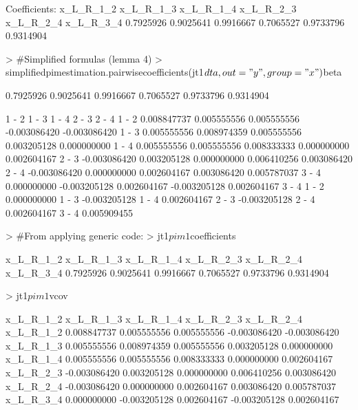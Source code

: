 \documentclass[12pt]{article}
\begin{document}
\begin{Schunk}
\begin{Soutput}
Coefficients:
x_L_R_1_2 x_L_R_1_3 x_L_R_1_4 x_L_R_2_3 x_L_R_2_4 x_L_R_3_4 
0.7925926 0.9025641 0.9916667 0.7065527 0.9733796 0.9314904 
\end{Soutput}
\begin{Sinput}
> 	#Simplified formulas (lemma 4)
> 	simplifiedpimestimation.pairwisecoefficients(jt1$dta, out="y", group="x")$beta
\end{Sinput}
\begin{Soutput}
[1] 0.7925926 0.9025641 0.9916667 0.7065527 0.9733796 0.9314904
\end{Soutput}
\begin{Soutput}
             1 - 2        1 - 3       1 - 4        2 - 3        2 - 4
1 - 2  0.008847737  0.005555556 0.005555556 -0.003086420 -0.003086420
1 - 3  0.005555556  0.008974359 0.005555556  0.003205128  0.000000000
1 - 4  0.005555556  0.005555556 0.008333333  0.000000000  0.002604167
2 - 3 -0.003086420  0.003205128 0.000000000  0.006410256  0.003086420
2 - 4 -0.003086420  0.000000000 0.002604167  0.003086420  0.005787037
3 - 4  0.000000000 -0.003205128 0.002604167 -0.003205128  0.002604167
             3 - 4
1 - 2  0.000000000
1 - 3 -0.003205128
1 - 4  0.002604167
2 - 3 -0.003205128
2 - 4  0.002604167
3 - 4  0.005909455
\end{Soutput}
\begin{Sinput}
> 	#From applying generic code:
> 	jt1$pim1$coefficients
\end{Sinput}
\begin{Soutput}
x_L_R_1_2 x_L_R_1_3 x_L_R_1_4 x_L_R_2_3 x_L_R_2_4 x_L_R_3_4 
0.7925926 0.9025641 0.9916667 0.7065527 0.9733796 0.9314904 
\end{Soutput}
\begin{Sinput}
> 	jt1$pim1$vcov
\end{Sinput}
\begin{Soutput}
             x_L_R_1_2    x_L_R_1_3   x_L_R_1_4    x_L_R_2_3    x_L_R_2_4
x_L_R_1_2  0.008847737  0.005555556 0.005555556 -0.003086420 -0.003086420
x_L_R_1_3  0.005555556  0.008974359 0.005555556  0.003205128  0.000000000
x_L_R_1_4  0.005555556  0.005555556 0.008333333  0.000000000  0.002604167
x_L_R_2_3 -0.003086420  0.003205128 0.000000000  0.006410256  0.003086420
x_L_R_2_4 -0.003086420  0.000000000 0.002604167  0.003086420  0.005787037
x_L_R_3_4  0.000000000 -0.003205128 0.002604167 -0.003205128  0.002604167

\end{Soutput}
\end{Schunk}
\end{document}
